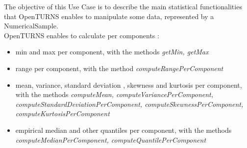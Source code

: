 \renewcommand{\filename}{docUC_InputWithData_StatisticalManipulation.tex}
\renewcommand{\filetitle}{UC :  Statistical manipulations on data : min, max, covariance, skewness, kurtosis, quantile, empirical CDF, Pearson, Kendall and Spearman correlation matrixes and rank/sort functionnalities}

\HeaderIIILevel

\label{statistical}





The objective of this Use Case is to describe the main statistical functionalities that OpenTURNS enables to manipulate some data, represented by a NumericalSample.\\





OpenTURNS enables to calculate per components :
\begin{itemize}
\item min and max per component, with the methods {\itshape getMin, getMax}
\item range per component, with the method {\itshape computeRangePerComponent}
\item mean, variance, standard deviation , skewness and kurtosis  per component, with the methods {\itshape computeMean, computeVariancePerComponent, computeStandardDeviationPerComponent, computeSkewnessPerComponent, computeKurtosisPerComponent}
\item empirical median and other quantiles per component, with the methods {\itshape computeMedianPerComponent, computeQuantilePerComponent}
\end{itemize}

